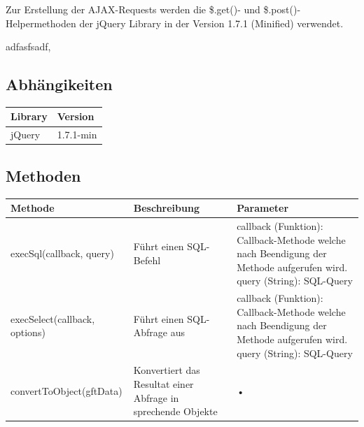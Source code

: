 Zur Erstellung der AJAX-Requests werden die \$.get()- und \$.post()-Helpermethoden der jQuery Library in der Version 1.7.1 (Minified) verwendet.

adfasfsadf,

\subsection{Abhängikeiten}
\begin{tabular}{|l|l|}
\hline 
Library & Version \\ 
\hline 
jQuery & 1.7.1-min \\ 
\hline 
\end{tabular} 

\subsection{Methoden}
\begin{tabular}{|l|p{5cm}|p{5cm}|}
\hline 
Methode & Beschreibung & Parameter \\ 
\hline 
execSql(callback, query) & Führt einen SQL-Befehl & callback (Funktion): Callback-Methode welche nach Beendigung der Methode aufgerufen wird. query (String): SQL-Query \\ 
\hline 
execSelect(callback, options) & Führt einen SQL-Abfrage aus & callback (Funktion): Callback-Methode welche nach Beendigung der Methode aufgerufen wird. query (String): SQL-Query \\ 
\hline 
convertToObject(gftData) & Konvertiert das Resultat einer Abfrage in sprechende Objekte & • \\ 
\hline 
\end{tabular} 
